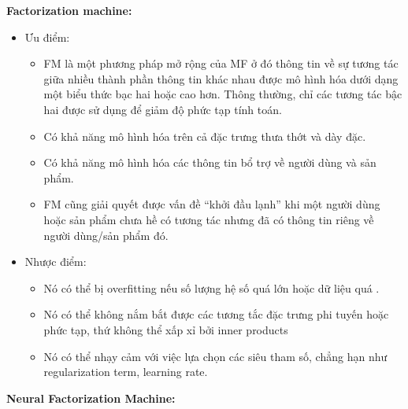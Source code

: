 \textbf{Factorization machine:}
\begin{itemize}
    \item Ưu điểm:
    \begin{itemize}
        \item FM là một phương pháp mở rộng của MF ở đó thông tin về sự tương tác giữa nhiều thành phần thông tin khác nhau được mô hình hóa dưới dạng một biểu thức bạc hai hoặc cao hơn. Thông thường, chỉ các tương tác bậc hai được sử dụng để giảm độ phức tạp tính toán.
        \item Có khả năng mô hình hóa trên cả đặc trưng thưa thớt và dày đặc.
        \item Có khả năng mô hình hóa các thông tin bổ trợ về người dùng và sản phẩm.
        \item FM cũng giải quyết được vấn đề “khởi đầu lạnh” khi một người dùng hoặc sản phẩm chưa hề có tương tác nhưng đã có thông tin riêng về người dùng/sản phẩm đó.
    \end{itemize}
    \item Nhược điểm:
    \begin{itemize}
        \item Nó có thể bị overfitting nếu số lượng hệ số quá lớn hoặc dữ liệu quá .
        \item Nó có thể không nắm bắt được các tương tắc đặc trưng phi tuyến hoặc phức tạp, thứ không thể xấp xỉ bởi inner products
        \item Nó có thể nhạy cảm với việc lựa chọn các siêu tham số, chẳng hạn như regularization term, learning rate.
    \end{itemize}
\end{itemize}
\textbf{Neural Factorization Machine:}
